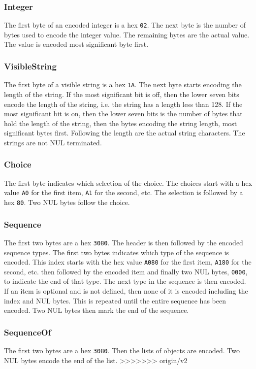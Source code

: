 \subsubsection{Integer}

The first byte of an encoded integer is a hex \verb+02+.  The next byte 
is the number of bytes used to encode the integer value.  The 
remaining bytes are the actual value.  The value is encoded 
most significant byte first.

\subsubsection{VisibleString}

The first byte of a visible string is a hex \verb+1A+.  
The next byte 
starts encoding the length of the string.  If the most 
significant bit is off, then the lower seven bits encode the 
length of the string, i.e. the string has a length less than 128. 
If the most significant bit is on, then 
the lower seven bits is the number of bytes that hold the length of 
the string, then the bytes encoding the string length, most significant 
bytes first.
Following the length are the actual string characters.
The strings are not NUL terminated.  

\subsubsection{Choice}


The first byte indicates which selection of the choice.  The choices 
start with a hex value \verb+A0+ for the first item, \verb+A1+ for 
the second, etc.  
The selection is followed by a hex \verb+80+.  Two NUL bytes follow 
the choice.

\subsubsection{Sequence}

The first two bytes are a hex \verb+3080+.  The header is 
then followed by 
the encoded sequence types.  The first two bytes indicates which type 
of the sequence is encoded.  This index starts with the hex value 
\verb+A080+ 
for the first item, \verb+A180+ for the second, etc. then 
followed by the 
encoded item and finally two NUL bytes, \verb+0000+, to indicate the end 
of that type.  The next type in the sequence is then encoded.  If an 
item is optional and is not defined, then none of it is encoded 
including the index and NUL bytes.  This is repeated until the entire 
sequence has been encoded.  Two NUL bytes then mark the end of the 
sequence.

\subsubsection{SequenceOf}

The first two bytes are a hex \verb+3080+.  Then the lists of objects are 
encoded.  Two NUL bytes encode the end of the list.
>>>>>>> origin/v2
